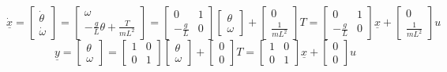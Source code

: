 \documentclass[
  letterpaper,
  DIV=11,
  numbers=noendperiod]{scrreprt}
\begin{document}
\[\dot{\underline{x}} = \begin{bmatrix}
    \dot{\theta} \\
    \dot{\omega}  \end{bmatrix} = \begin{bmatrix}
    \omega \\
    -\frac{g}{L} \theta + \frac{T}{mL^2}
\end{bmatrix} = \begin{bmatrix}
    0 & 1\\
    -\frac{g}{L} & 0
\end{bmatrix} \begin{bmatrix}
    \theta \\
    \omega  \end{bmatrix} + \begin{bmatrix}
        0 \\
        \frac{1}{mL^2}  \end{bmatrix} T = \begin{bmatrix}
            0 & 1\\
            -\frac{g}{L} & 0
        \end{bmatrix} \underline{x} + \begin{bmatrix}
                0 \\
                \frac{1}{mL^2}  \end{bmatrix} u\]
\[\underline{y} = \begin{bmatrix}
    \theta \\
    \omega  \end{bmatrix} = \begin{bmatrix}
        1 & 0\\
        0 & 1
    \end{bmatrix} \begin{bmatrix}
        \theta \\
        \omega  \end{bmatrix} + \begin{bmatrix}
            0 \\
            0  \end{bmatrix} T = \begin{bmatrix}
                1 & 0\\
                0 & 1
            \end{bmatrix} \underline{x} + \begin{bmatrix}
                    0 \\
                    0  \end{bmatrix} u\]
\end{document}
